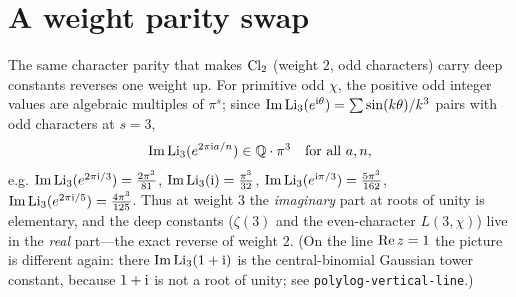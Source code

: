 \section{A weight parity swap}
The same character parity that makes $\operatorname{Cl}_2$ (weight $2$, odd characters) carry deep constants reverses one
weight up. For primitive odd $\chi$, the positive odd integer values are algebraic multiples of $\pi^s$;
since $\operatorname{Im}\operatorname{Li}_3(e^{\mathrm{i}\theta})=\sum\sin(k\theta)/k^3$ pairs with odd characters at $s=3$,
\begin{equation}\label{clausen:eq:swap}
  \operatorname{Im}\operatorname{Li}_3(e^{2\pi\mathrm{i} a/n})\in\mathbb Q\cdot\pi^3\quad\text{for all }a,n,
\end{equation}
e.g. $\operatorname{Im}\operatorname{Li}_3(e^{2\pi\mathrm{i}/3})=\tfrac{2\pi^3}{81}$, $\operatorname{Im}\operatorname{Li}_3(\mathrm{i})=\tfrac{\pi^3}{32}$,
$\operatorname{Im}\operatorname{Li}_3(e^{\mathrm{i}\pi/3})=\tfrac{5\pi^3}{162}$, $\operatorname{Im}\operatorname{Li}_3(e^{2\pi\mathrm{i}/5})=\tfrac{4\pi^3}{125}$. Thus at
weight $3$ the \emph{imaginary} part at roots of unity is elementary, and the deep constants
($\zeta(3)$ and the even-character $L(3,\chi)$) live in the \emph{real} part---the exact reverse of weight
$2$. (On the line $\operatorname{Re} z=1$ the picture is different again: there $\operatorname{Im}\operatorname{Li}_3(1+\mathrm{i})$ is the central-binomial
Gaussian tower constant, because $1+\mathrm{i}$ is not a root of unity; see \texttt{polylog-vertical-line}.)
